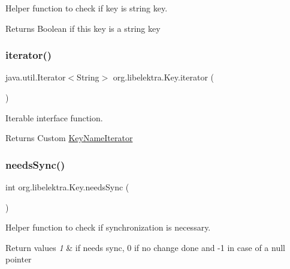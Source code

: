 Helper function to check if key is string key. 

\begin{DoxyReturn}{Returns}
Boolean if this key is a string key 
\end{DoxyReturn}
\mbox{\label{classorg_1_1libelektra_1_1Key_ad948a4ab2d5142b439830ddc5c16cc38}} 
\subsubsection{\texorpdfstring{iterator()}{iterator()}}
{\footnotesize\ttfamily java.\+util.\+Iterator$<$String$>$ org.\+libelektra.\+Key.\+iterator (\begin{DoxyParamCaption}{ }\end{DoxyParamCaption})\hspace{0.3cm}{\ttfamily [inline]}}



Iterable interface function. 

\begin{DoxyReturn}{Returns}
Custom \hyperlink{classorg_1_1libelektra_1_1KeyNameIterator}{Key\+Name\+Iterator} 
\end{DoxyReturn}
\mbox{\label{classorg_1_1libelektra_1_1Key_a6f5afab907a28b264af0981e9db58c64}} 
\subsubsection{\texorpdfstring{needs\+Sync()}{needsSync()}}
{\footnotesize\ttfamily int org.\+libelektra.\+Key.\+needs\+Sync (\begin{DoxyParamCaption}{ }\end{DoxyParamCaption})\hspace{0.3cm}{\ttfamily [inline]}}



Helper function to check if synchronization is necessary. 


\begin{DoxyRetVals}{Return values}
{\em 1} & if needs sync, 0 if no change done and -\/1 in case of a null pointer \\
\hline
\end{DoxyRetVals}
\mbox{\label{classorg_1_1libelektra_1_1Key_ace2853c3ca003e9099272871a6d61ad6}} 
